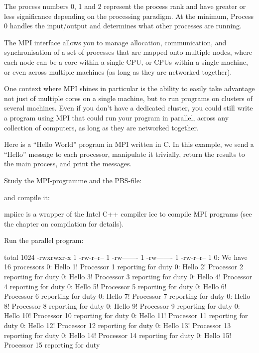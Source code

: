 The process numbers 0, 1 and 2 represent the process rank and have greater or
less significance depending on the processing paradigm. At the minimum, Process
0 handles the input/output and determines what other processes are running.

The MPI interface allows you to manage allocation, communication, and
synchronisation of a set of processes that are mapped onto multiple nodes,
where each node can be a core within a single CPU, or CPUs within a single
machine, or even across multiple machines (as long as they are networked
together).

One context where MPI shines in particular is the ability to easily take
advantage not just of multiple cores on a single machine, but to run programs
on clusters of several machines. Even if you don't have a dedicated cluster,
you could still write a program using MPI that could run your program in
parallel, across any collection of computers, as long as they are networked
together.

Here is a ``Hello World'' program in MPI written in C. In this example, we send a
``Hello'' message to each processor, manipulate it trivially, return the results
to the main process, and print the messages.

Study the MPI-programme and the PBS-file:


and compile it:

\begin{prompt}
\end{prompt}

mpiicc is a wrapper of the Intel C++ compiler icc to compile MPI programs (see
the chapter on compilation for details).

Run the parallel program:

\begin{prompt}
total 1024
-rwxrwxr-x 1 %
-rw-r--r-- 1 %
-rw------- 1 %
-rw------- 1 %
-rw-r--r-- 1 %
0: We have 16 processors
0: Hello 1! Processor 1 reporting for duty
0: Hello 2! Processor 2 reporting for duty
0: Hello 3! Processor 3 reporting for duty
0: Hello 4! Processor 4 reporting for duty
0: Hello 5! Processor 5 reporting for duty
0: Hello 6! Processor 6 reporting for duty
0: Hello 7! Processor 7 reporting for duty
0: Hello 8! Processor 8 reporting for duty
0: Hello 9! Processor 9 reporting for duty
0: Hello 10! Processor 10 reporting for duty
0: Hello 11! Processor 11 reporting for duty
0: Hello 12! Processor 12 reporting for duty
0: Hello 13! Processor 13 reporting for duty
0: Hello 14! Processor 14 reporting for duty
0: Hello 15! Processor 15 reporting for duty
\end{prompt}

